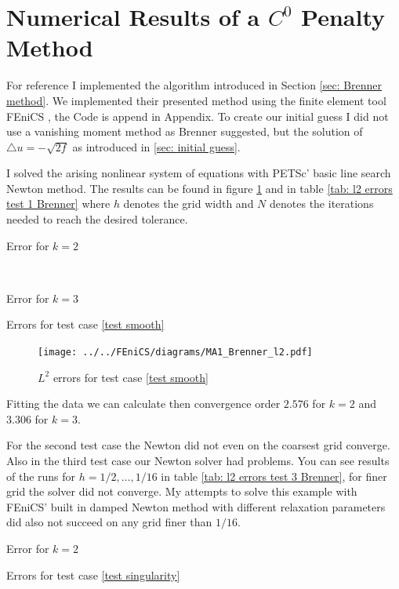 \section{Numerical Results of a $C^0$ Penalty Method}



For reference I implemented the algorithm introduced in Section \ref{sec: Brenner method}.
We implemented their presented method using the finite element tool FEniCS \cite{FEniCS}, the Code is append in Appendix. 
To create our initial guess I did not use a vanishing moment method as Brenner suggested, but the solution of $\triangle u = -\sqrt{2f}$ as introduced in \ref{sec: initial guess}. 

I solved the arising nonlinear system of equations with PETSc' basic line search Newton method. 
The results can be found in figure \ref{fig: Brenner test1} and in table \ref{tab: l2 errors test 1 Brenner} where $h$ denotes the grid width and $N$ denotes the iterations needed to reach the desired tolerance. 

\begin{table}[h]
	\begin{subtable}[b]{0.45\textwidth}
		\centering
		\pgfplotstabletypeset[columns={iterations, l2error, h1error,N},
				    every row 0 column 0/.style={set content=init},
		]\MAOneBrennerTwo
    	\caption{Error for $k=2$}
   \end{subtable}
   ~
	\begin{subtable}[b]{0.45\textwidth}
		\centering
		\pgfplotstabletypeset[columns={iterations, l2error, h1error,N},
				    every row 0 column 0/.style={set content=init},
		]\MAOneBrennerThree
 	\caption{Error for $k=3$}
	\end{subtable}
	\caption{Errors for test case \ref{test smooth}}
	\label{tab: l2 errors test 1 Brenner}
\end{table}
\begin{figure}[h!]
\centering
	\texttt{[image: ../../FEniCS/diagrams/MA1\_Brenner\_l2.pdf]}
	\caption{$L^2$ errors for test case \ref{test smooth}}
	\label{fig: Brenner test1}
\end{figure}
Fitting the data we can calculate then convergence order  $2.576$ for $k=2$ and $3.306$ for $k=3$.

For the second test case the Newton did not even on the coarsest grid converge. Also in the third test case our Newton solver had problems. You can see results of the runs for $h=1/2, \dots, 1/16$ in table \ref{tab: l2 errors test 3 Brenner}, for finer grid the solver did not converge. My attempts to solve this example with FEniCS' built in damped Newton method with different relaxation parameters did also not succeed on any grid finer than $1/16$.
\begin{table}[h]
		\centering
		\pgfplotstabletypeset[columns={iterations, l2error, h1error,N},
				    every row 0 column 0/.style={set content=init},
		]\MAThreeBrennerTwo
    	\caption{Error for $k=2$}
	\caption{Errors for test case \ref{test singularity}}
	\label{tab: l2 errors test 3 Brenner}
\end{table}

